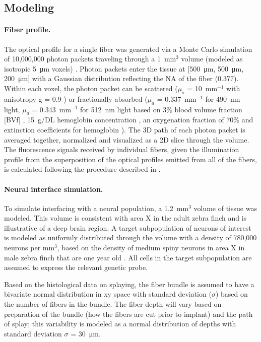 \subsection{Modeling}
\label{sec:methods-modeling}

\paragraph{Fiber profile.} The optical profile for a single fiber was 
generated via a Monte Carlo simulation of 10,000,000 
photon packets traveling through a 1~mm$^3$ volume (modeled as isotropic 
5~\si{\micro\meter} voxels) \cite{Boas:2002ue}. Photon packets enter the tissue at 
[500~\si{\micro\meter}, 500~\si{\micro\meter}, 200~\si{\micro\meter}] with a Gaussian distribution 
reflecting the NA of the fiber (0.377). Within each voxel, the photon 
packet can be scattered ($\mu_s$ = 10~mm$^{-1}$ with anisotropy g = 0.9 
\cite{Yi:2012wp}) or fractionally absorbed ($\mu_a$ = 0.337~mm$^{-1}$ 
for 490~nm light, $\mu_a$ = 0.343~mm$^{-1}$ for 512~nm light based on 
3\% blood volume fraction [BVf] \cite{S:2010hi}, 15~g/DL hemoglobin 
concentration \cite{Raabe:2011uo}, an oxygenation fraction of 70\% and 
extinction coefficients for hemoglobin \cite{kollias1999tabulated}). 
The 3D path of each photon packet is averaged together, normalized and 
visualized as a 2D slice through the volume. The fluorescence signals 
received by individual fibers, given the illumination profile from the 
superposition of the optical profiles emitted from all of the fibers, 
is calculated following the procedure described in 
\cite{Hillman:2004wca,Burgess:2008uu}.

\paragraph{Neural interface simulation.} To simulate interfacing with 
a neural population, a 1.2~mm$^3$ volume of tissue was modeled. This 
volume is consistent with area X in the adult zebra finch 
\cite{Bottjer:1985vs} and is illustrative of a deep brain region. 
A target subpopulation of neurons of interest is modeled as 
uniformly distributed through the volume with a density of 780,000 
neurons per mm$^3$, based on the density of medium spiny neurons 
in area X in male zebra finch that are one year old 
\cite{KosubekLanger:2017jb}. All cells in the target subpopulation 
are assumed to express the relevant genetic probe.

Based on the histological data on splaying, the fiber bundle is 
assumed to have a bivariate normal distribution in xy space with 
standard deviation ($\sigma$) based on the number of fibers in the 
bundle. The fiber depth will vary based on preparation of the 
bundle (how the fibers are cut prior to implant) and the path of 
splay; this variability is modeled as a normal distribution of 
depths with standard deviation $\sigma$ = 30~\si{\micro\meter}.


